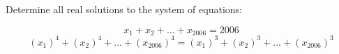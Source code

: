 Determine all real solutions to the system of equations:

\[
x_1+ x_2 + ...+x_{2006}=2006
\]\[
(x_1)^4+ (x_2)^4 + ...+(x_{2006})^4=(x_1)^3+ (x_2)^3 + ...+(x_{2006})^3
\]
